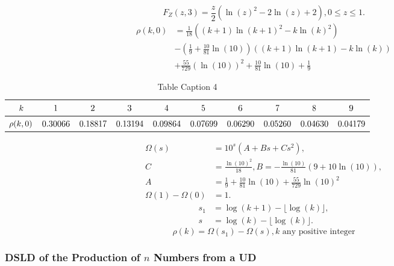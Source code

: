 \documentclass[titlepage,fleqn]{article}%
\begin{document}
\[
F_{Z}(z,3)=\frac{z}{2}\left(  \ln(z)^{2}-2\ln(z)+2\right)  ,0\leq z\leq1.
\]%
\begin{align*}
\rho(k,0)  &  =\frac{1}{18}\left(  (k+1)\ln(k+1)^{2}-k\ln(k)^{2}\right) \\
&  -\left(  \frac{1}{9}+\frac{10}{81}\ln(10)\right)  \left(  (k+1)\ln
(k+1)-k\ln(k)\right) \\
&  +\frac{55}{729}\left(  \ln(10)\right)  ^{2}+\frac{10}{81}\ln(10)+\frac
{1}{9}%
\end{align*}
%

\begin{table}[!htbp] \centering
\begin{tabular}
[c]{|c|c|c|c|c|c|c|c|c|c|}\hline\hline
${\small k}$ & ${\small 1}$ & ${\small 2}$ & ${\small 3}$ & ${\small 4}$ &
${\small 5}$ & ${\small 6}$ & ${\small 7}$ & ${\small 8}$ & ${\small 9}%
$\\\hline
${\small \rho(k,0)}$ & ${\small 0.30066}$ & ${\small 0.18817}$ &
${\small 0.13194}$ & ${\small 0.09864}$ & ${\small 0.07699}$ &
${\small 0.06290}$ & ${\small 0.05260}$ & ${\small 0.04630}$ &
${\small 0.04179}$\\\hline\hline
\end{tabular}
\caption{Table Caption 4}\label{TableKey4}%
\end{table}%
%

\begin{align*}
\Omega(s)  &  =10^{s}\left(  A+Bs+Cs^{2}\right)  ,\\
C  &  =\frac{\ln(10)^{2}}{18},B=-\frac{\ln(10)}{81}(9+10\ln(10)),\\
A  &  =\frac{1}{9}+\frac{10}{81}\ln(10)+\frac{55}{729}\ln(10)^{2}\\
\Omega(1)-\Omega(0)  &  =1.
\end{align*}%
\begin{align*}
s_{1}  &  =\log(k+1)-\lfloor\log(k)\rfloor,\\
s  &  =\log(k)-\lfloor\log(k)\rfloor.
\end{align*}%
\[
\rho(k)=\Omega(s_{1})-\Omega(s),k\text{ \ any positive integer}%
\]


\subsubsection{DSLD of the Production of $n$ Numbers from a UD}%
\end{document}

